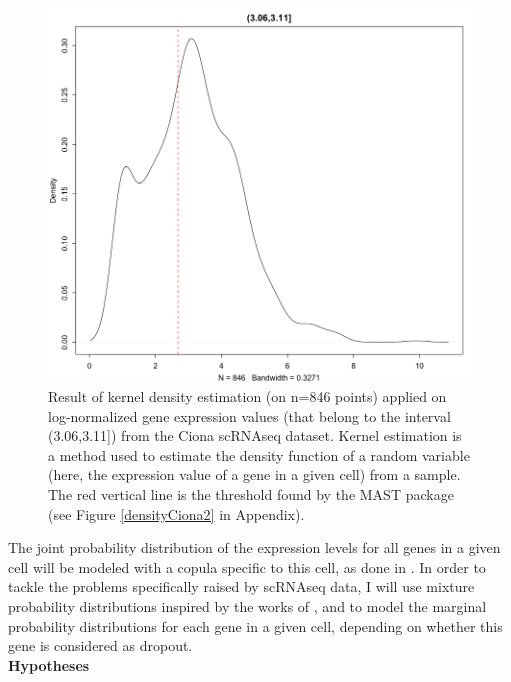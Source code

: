 \documentclass{report}
\begin{document}
\begin{figure}[H]
\centering
\includegraphics[scale=0.35]{illustrations/densityCionaLogNorm.png}
\caption{Result of kernel density estimation\cite{parzen1962estimation} (on n=846 points) applied on log-normalized gene expression values (that belong to the interval (3.06,3.11]) from the Ciona\cite{suyama2016singlecell} scRNAseq dataset. Kernel estimation is a method used to estimate the density function of a random variable (here, the expression value of a gene in a given cell) from a sample. The red vertical line is the threshold found by the MAST package (see Figure \ref{densityCiona2} in Appendix).}
\label{densityCiona}
\end{figure}

The joint probability distribution of the expression levels for all genes in a given cell will be modeled with a copula specific to this cell, as done in \cite{zhang2017classification}. In order to tackle the problems specifically raised by scRNAseq data, I will use mixture probability distributions inspired by the works of \cite{kharchenko2014bayesian}, and \cite{finak2015mast} to model the marginal probability distributions for each gene in a given cell, depending on whether this gene is considered as dropout.\\

\bigskip
\noindent \textbf{Hypotheses}
\bigskip
\end{document}
